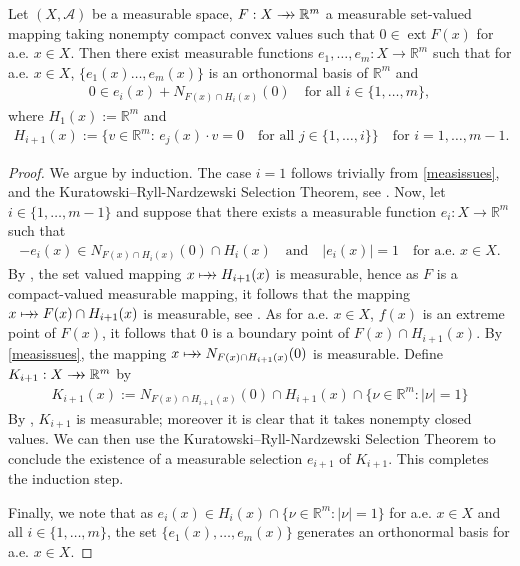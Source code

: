 \documentclass[hidelinks,onefignum,onetabnum]{siamart220329}
\newcommand{\rrightarrow}{\mathrel{\mathrlap{\rightarrow}\mkern1mu\rightarrow}}
\let\twoheadrightarrow\rrightarrow
\newcommand{\mapsmto}{\mathrel{\mathrlap{\mapsto}\mkern1mu\rightarrow}}
\newcommand{\ext}{\operatorname{ext}}
\begin{document}
\begin{lemma}\label{norconlem}
	Let $(X,\mathcal A)$ be a measurable space,  $F:X\twoheadrightarrow \mathbb R^m$ a measurable set-valued mapping taking nonempty compact convex values such that $0\in\ext{F(x)}$ for a.e. $x\in X$.  Then there exist measurable functions $e_1,\dots, e_m: X\to\mathbb R^m$ such that for a.e. $x\in X$,  $\{e_1(x)\dots,e_{m}(x)\}$ is an orthonormal basis of  $\mathbb R^m$ and
	\begin{align}\label{l1app}
	0\in e_{i}(x)+N_{F(x)\cap H_{i}(x)}(0)\quad\text{for all $i\in\{1,\dots, m\}$},
	\end{align}
		where $H_1(x):=\mathbb R^m$ and 
		\begin{align*}
			H_{i+1}(x):=\{v\in\mathbb R^m:\,e_{j}(x)\cdot v=0\quad\text{for all $j\in\{1,\dots,i\}$}\}\quad\text{for $i=1,\dots,m-1$}.
		\end{align*}
\end{lemma}
\begin{proof}
	We argue by induction.
	The case $i=1$ follows trivially from \cref{measissues}, and the Kuratowski–Ryll-Nardzewski Selection Theorem, see \cite[Theorem 18.13]{Infdim}.
	Now, let $i\in\{1,\dots,m-1\}$ and suppose that there exists a measurable function $e_{i}:X\to\mathbb R^m$ such that
	\begin{align*}
		-e_i(x)\in N_{F(x)\cap H_i(x)}(0)\cap H_{i}(x)\quad\text{and}\quad |e_i(x)|=1\quad\text{for a.e. $x\in X$}.
	\end{align*}
	By \cite[Corollary 3.6]{Measconv}, the set valued mapping $x \mapsmto H_{i+1}(x)$ is measurable, hence as $F$ is a compact-valued measurable mapping, it follows that  the mapping $x\mapsmto F(x)\cap H_{i+1}(x)$ is measurable, see \cite[Proposition 6.2.21]{Anhand}. As for a.e. $x\in X$,  $f(x)$ is an extreme point of $F(x)$, it follows that $0$ is a boundary point of $F(x)\cap H_{i+1}(x)$. By \cref{measissues}, the mapping $x\mapsmto N_{F(x)\cap H_{i+1}(x)}(0)$ is measurable. Define $K_{i+1}:X\twoheadrightarrow\mathbb R^m$ by 
	\begin{align*}
		K_{i+1}(x):=N_{F(x)\cap H_{i+1}(x)}(0)\cap H_{i+1}(x)\cap \{\nu\in\mathbb R^m:|\nu|=1\}
	\end{align*}
	By \cite[Proposition 6.2.21]{Anhand}, $K_{i+1}$ is measurable; moreover it is clear that it takes nonempty closed values. We can then use the  Kuratowski–Ryll-Nardzewski Selection Theorem to conclude the existence of a measurable selection  $e_{i+1}$ of $K_{i+1}$. This completes the induction step.
	
	Finally, we note that as $e_{i}(x)\in H_{i}(x)\cap\{\nu\in\mathbb R^m:|\nu|=1\}$ for a.e. $x\in X$ and all $i\in\{1,\dots, m\}$, the set $\{e_1(x),\dots,e_{m}(x)\}$ generates an orthonormal basis for a.e. $x\in X$.
\end{proof}
\end{document}
